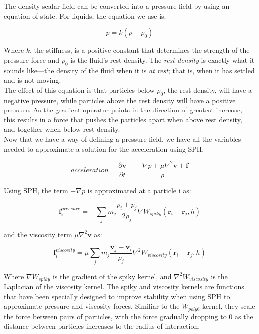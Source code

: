 \documentclass[]{article}
\begin{document}
	The density scalar field can be converted into a pressure field by using an equation of state. For liquids, the
	equation we use is:
	
	\begin{equation}
		\label{eq_densityToPressure}
		p = k(\rho - \rho_0)
	\end{equation}
	
	Where \( k \), the stiffness, is a positive constant that determines the strength of the pressure force and 
	\( \rho_0 \) is the fluid's rest density. The \textit{rest density} is exactly what it sounds like---the density of the 
	fluid when it is \textit{at rest}; that is, when it has settled and is not moving.\\
	
	The effect of this equation is that particles below \(\rho_0\), the rest density, will have a negative pressure, 
	while particles above the rest density will have a positive pressure. As the gradient operator points in the 
	direction of greatest increase, this results in a force that pushes the particles apart when above rest density,
	and together when below rest density.\\
	
	Now that we have a way of defining a pressure field, we have all the variables needed to approximate a solution
	for the acceleration using SPH.
	
	\begin{equation}
	acceleration = \frac{\partial \mathbf{v}}{\partial t} = \frac{- \nabla p + \mu \nabla ^2 \mathbf{v} + \mathbf{f}}{\rho}
	\end{equation}
	
	Using SPH, the term \(- \nabla p\) is approximated at a particle i as:
	
	\begin{equation}
		\mathbf{f}_{i}^{pressure} = - \sum_{j}^{} m_j \frac{p_i + p_j}{2 \rho_j} \nabla W_{spiky}(\mathbf{r}_i - \mathbf{r}_j, h)
	\end{equation}
	
	and the viscosity term \(\mu \nabla ^2 \mathbf{v} \) as:
	
	\begin{equation}
		\mathbf{f}_{i}^{viscosity} = \mu \sum_{j}^{} m_j \frac{ \mathbf{v}_j - \mathbf{v}_i}{\rho_j} \nabla ^ 2 W_{viscosity}(\mathbf{r}_i - \mathbf{r}_j, h)
	\end{equation}
	
	Where \( \nabla W_{spiky} \) is the gradient of the spiky kernel, and \( \nabla ^ 2 W_{viscosity} \) is the 
	Laplacian of the viscosity kernel. The spiky and viscosity kernels are functions that have been specially designed
	to improve stability when using SPH to approximate pressure and viscosity forces. Similiar to the \(W_{poly6}\) kernel,
	they scale the force between pairs of particles, with the force gradually dropping to 0 as the distance between particles
	increases to the radius of interaction.\\
	
\end{document}
